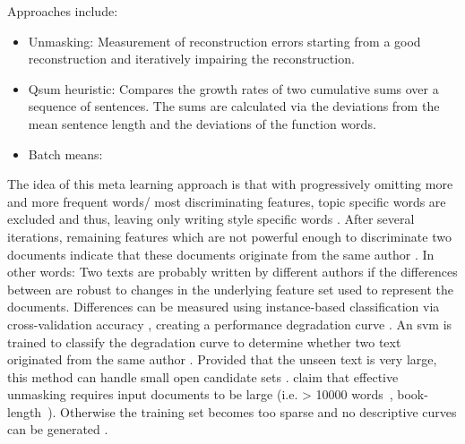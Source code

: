 \begin{definition}
    Approaches include:
    \begin{itemize}
        \item Unmasking: Measurement of reconstruction errors starting from a good reconstruction and iteratively impairing the reconstruction. %
        \item Qsum heuristic: Compares the growth rates of two cumulative sums over a sequence of sentences. The sums are calculated via the deviations from the mean sentence length and the deviations of the function words.
        \item Batch means: 
    \end{itemize}
\end{definition}

\begin{definition}
    [Unmasking]
    The idea of this meta learning approach is that with progressively omitting more and more frequent words/ most discriminating features, 
    topic specific words are excluded and thus, leaving only writing style specific words \cite{stein_intrinsic_2011}.
    After several iterations, remaining features which are not powerful enough to discriminate two documents indicate that 
    these documents originate from the same author \cite{stein_intrinsic_2011,tyo_state_2022}.
    In other words: 
    Two texts are probably written by different authors if the differences between are robust to changes in the underlying feature set used to represent the documents.
    Differences can be measured using instance-based classification via cross-validation accuracy \cite{koppel_authorship_2011,bevendorff_generalizing_2019}, 
    creating a performance degradation curve \cite{tyo_state_2022}.
    An \ac{svm} is trained to classify the degradation curve to determine whether two text originated from the same author \cite{tyo_state_2022,bevendorff_generalizing_2019}.
    Provided that the unseen text is very large, this method can handle small open candidate sets \cite{koppel_authorship_2011}.
    \citet{koppel_determining_2014,bevendorff_generalizing_2019} claim that effective unmasking requires input documents to be large 
    (i.e. > 10000 words~\cite{koppel_determining_2014}, book-length~\cite{bevendorff_generalizing_2019}).
    Otherwise the training set becomes too sparse and no descriptive curves can be generated \cite{bevendorff_generalizing_2019}.
\end{definition}


